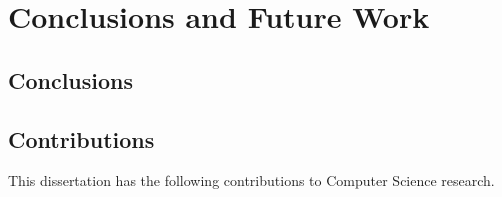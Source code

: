 \chapter[Conclusions and Future Work]{Conclusions and Future Work}
\label{chap:Conclusions}

\section{Conclusions}
\label{conclusions}



\section{Contributions}
\label{contributions}

This dissertation has the following contributions to Computer Science research.

